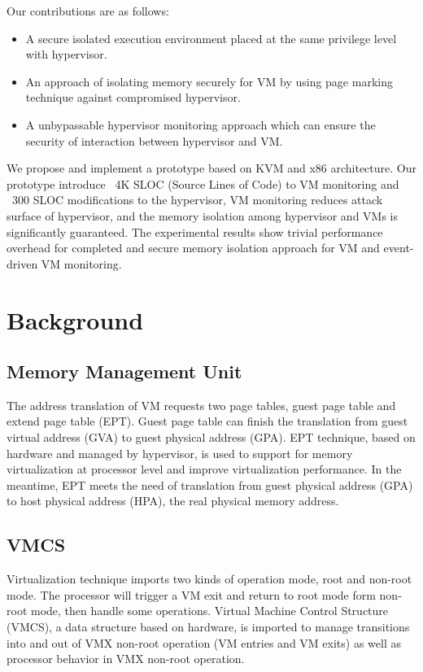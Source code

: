 \documentclass[conference]{IEEEtran}
\begin{document}
Our contributions are as follows:
\begin{itemize}
\item A secure isolated execution environment placed at the same privilege level with hypervisor.
\item{An approach of isolating memory securely for VM by using page marking technique against compromised hypervisor.}
\item{A unbypassable hypervisor monitoring approach which can ensure the security of interaction between hypervisor and VM.}
\end{itemize}

We propose and implement a prototype based on KVM and x86 architecture. Our prototype introduce ~4K SLOC (Source Lines of Code) to VM monitoring and ~300 SLOC modifications to the hypervisor, VM monitoring reduces attack surface of hypervisor, and the memory isolation among hypervisor and VMs is significantly guaranteed. The experimental results show trivial performance overhead for completed and secure memory isolation approach for VM and event-driven VM monitoring.


\section{Background}
\subsection{Memory Management Unit}
The address translation of VM requests two page tables, guest page table and extend page table (EPT). Guest page table can finish the translation from guest virtual address (GVA) to guest physical address (GPA). EPT technique, based on hardware and managed by hypervisor, is used to support for memory virtualization at processor level and improve virtualization performance. In the meantime, EPT meets the need of translation from guest physical address (GPA) to host physical address (HPA), the real physical memory address. 

\subsection{VMCS}
Virtualization technique imports two kinds of operation mode, root and non-root mode. The processor will trigger a VM exit and return to root mode form non-root mode, then handle some operations. Virtual Machine Control Structure (VMCS), a data structure based on hardware, is imported to manage transitions into and out of VMX non-root operation (VM entries and VM exits) as well as processor behavior in VMX non-root operation.
\end{document}
